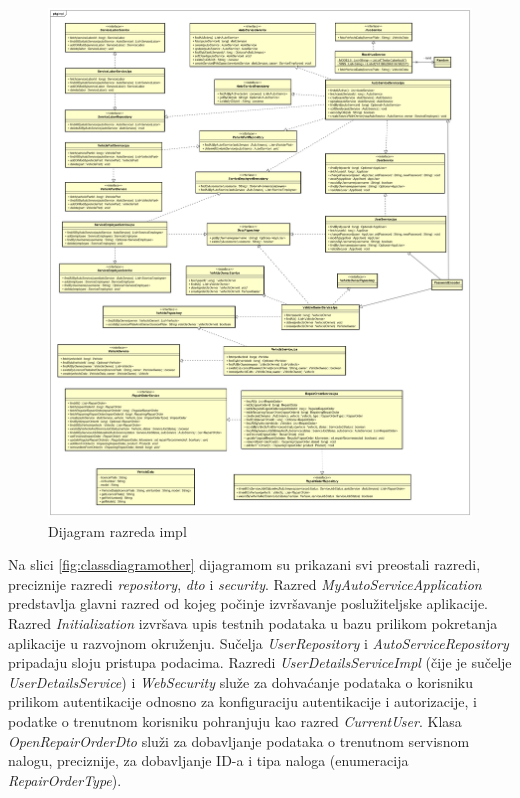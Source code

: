 		\begin{figure}[H]
			\centering
			\includegraphics[width=1.0\linewidth]{dijagrami/class_diagram_impl}
			\caption{Dijagram razreda impl}
			\label{fig:classdiagramimpl}
		\end{figure}
	
		Na slici \ref{fig:classdiagramother} dijagramom su prikazani svi preostali razredi, preciznije razredi \textit{repository}, \textit{dto} i \textit{security}. Razred \textit{MyAutoServiceApplication} predstavlja glavni razred od kojeg počinje izvršavanje poslužiteljske aplikacije. Razred \textit{Initialization} izvršava upis testnih podataka u bazu prilikom pokretanja aplikacije u razvojnom okruženju. Sučelja \textit{UserRepository} i \textit{AutoServiceRepository} pripadaju sloju pristupa podacima. Razredi \textit{UserDetailsServiceImpl} (čije je sučelje \textit{UserDetailsService}) i \textit{WebSecurity} služe za dohvaćanje podataka o korisniku prilikom autentikacije odnosno za konfiguraciju autentikacije i autorizacije, i podatke o trenutnom korisniku pohranjuju kao razred \textit{CurrentUser}. Klasa \textit{OpenRepairOrderDto} služi za dobavljanje podataka o trenutnom servisnom nalogu, preciznije, za dobavljanje ID-a i tipa naloga (enumeracija \textit{RepairOrderType}).
	
